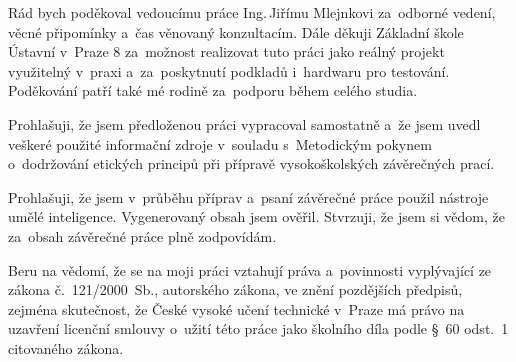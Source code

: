 \documentclass[czech,bachelor,oneside]{ctufit-thesis}
\begin{document}
\frontmatter\frontmatterinit %

\thispagestyle{empty}\maketitle\thispagestyle{empty}\cleardoublepage %



\imprintpage %
\stopTOCentries

\begin{acknowledgmentpage}
	Rád bych poděkoval vedoucímu práce Ing.\,Jiřímu Mlejnkovi za~odborné vedení, věcné připomínky a~čas věnovaný konzultacím. Dále děkuji Základní škole Ústavní v~Praze 8 za~možnost realizovat tuto práci jako reálný projekt využitelný v~praxi a~za~poskytnutí podkladů i~hardwaru pro testování. Poděkování patří také mé rodině za~podporu během celého studia.
\end{acknowledgmentpage}


\begin{declarationpage}
	Prohlašuji, že jsem předloženou práci vypracoval samostatně a~že jsem uvedl veškeré použité informační zdroje v~souladu s~Metodickým pokynem o~dodržování etických principů při přípravě vysokoškolských závěrečných prací.

	Prohlašuji, že jsem v~průběhu příprav a~psaní závěrečné práce použil nástroje umělé inteligence. Vygenerovaný obsah jsem ověřil. Stvrzuji, že jsem si vědom, že za~obsah závěrečné práce plně zodpovídám.

	Beru na vědomí, že se na moji práci vztahují práva a~povinnosti vyplývající ze zákona č.~121/2000~Sb., autorského zákona, ve znění pozdějších předpisů, zejména skutečnost, že České vysoké učení technické v~Praze má právo na uzavření licenční smlouvy o~užití této práce jako školního díla podle §~60 odst.~1 citovaného zákona.
\end{declarationpage}
\end{document}

